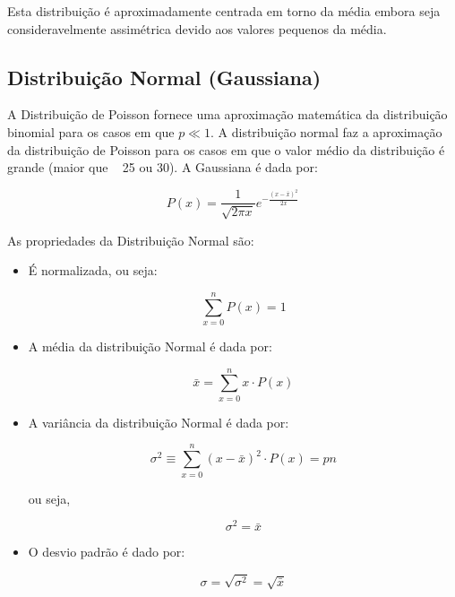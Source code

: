 \documentclass[11pt,a4paper]{article}
\begin{document}
		Esta distribuição é aproximadamente centrada em torno da média embora seja consideravelmente assimétrica devido aos valores pequenos da média.


	\subsection{Distribuição Normal (Gaussiana)}

		A Distribuição de Poisson fornece uma aproximação matemática da distribuição binomial para os casos em que $p \ll 1$. A distribuição normal faz a aproximação da distribuição de Poisson para os casos em que o valor médio da distribuição é grande (maior que ~ 25 ou 30). A Gaussiana é dada por:

			\begin{equation}
				P(x) = \frac{1}{\sqrt{2 \pi x}} e^{-\frac{(x - \bar{x})^2}{2\bar{x}}}
			\end{equation}

		As propriedades da Distribuição Normal são:

			\begin{itemize}
				\item É normalizada, ou seja:
				
					\begin{equation}
						\sum_{x = 0}^{n} P(x) = 1
					\end{equation}

				\item A média da distribuição Normal é dada por:
			
					\begin{equation}
						\bar{x} = \sum_{x = 0}^{n} x \cdot P(x)
					\end{equation}
	
				\item A variância da distribuição Normal é dada por:
				
					\begin{equation}
						\sigma^2 \equiv \sum_{x = 0}^{n} (x - \bar{x})^2 \cdot P(x) = pn
					\end{equation}
	
					ou seja,
	
					\begin{equation}
						\sigma^2 = \bar{x}
					\end{equation}
	
				\item O desvio padrão é dado por:
				
					\begin{equation}
						\sigma = \sqrt{\sigma^2} = \sqrt{\bar{x}}
					\end{equation}
			\end{itemize}
\end{document}
